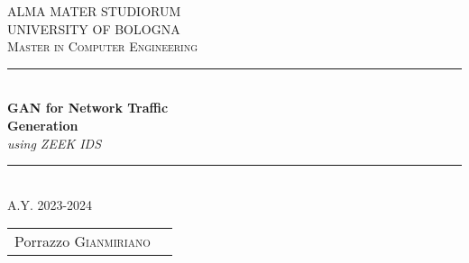 \documentclass[a4paper,11pt]{report}
\begin{document}

\begin{titlepage}
    \newcommand{\HRule}{\rule{\linewidth}{0.5mm}}
    \center
        \vspace*{\baselineskip}
        \vfill\vfill\vfill\vfill\vfill
        \textsc{\LARGE ALMA MATER STUDIORUM \\ UNIVERSITY OF BOLOGNA }\\[1.5cm]
        
        \textsc{\Large Master in Computer Engineering}\\[0.5cm]
        \HRule\\[0.4cm]
        {\huge\bfseries GAN for Network Traffic \\ Generation}\\[0.4cm]
        {\Large \textit{using ZEEK IDS}}
        \HRule\\[1.5cm]
        {\large A.Y. 2023-2024}
        \vfill\vfill
		        \center
            \begin{tabular}[t]{@{} r l @{}}
			      \large
			          Porrazzo \textsc{Gianmiriano}\\ %
            \end{tabular}

        \vfill\vfill\vfill %
	
	\vfill %
	
\end{titlepage}


    \hypersetup{
        colorlinks=true,
        linkcolor=black,
        citecolor=black
    }
    \tableofcontents
    
    
    
    
    
    \printbibliography[heading=bibintoc]
\end{document}
